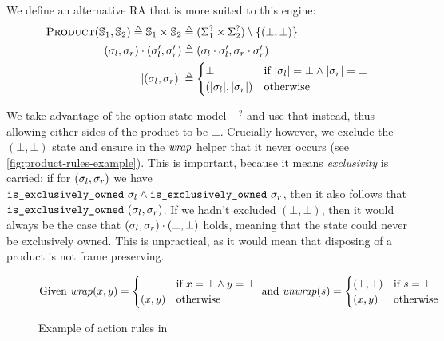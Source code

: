 We define an alternative \Product{} RA that is more suited to this engine: \begin{align*}
	\textsc{Product}(\mathbb S_1,\mathbb S_2) \triangleq \mathbb S_1 \times \mathbb S_2 &\triangleq (\Sigma_1^? \times \Sigma_2^?) \setminus \{(\bot, \bot)\}\\
	(\sigma_l, \sigma_r) \cdot (\sigma_l', \sigma_r') &\triangleq (\sigma_l \cdot \sigma_l', \sigma_r \cdot \sigma_r')\\
	|(\sigma_l, \sigma_r)| &\triangleq \begin{cases}
		\bot &\text{if}~|\sigma_l|=\bot\land |\sigma_r|=\bot\\
		(|\sigma_l|, |\sigma_r|) &\text{otherwise}
 	\end{cases}
\end{align*}

We take advantage of the option state model $-^?$ and use that instead, thus allowing either sides of the product to be $\bot$. Crucially however, we exclude the $(\bot, \bot)$ state and ensure in the ${\operatorname{\mathit{wrap}}}$ helper that it never occurs (see \autoref{fig:product-rules-example}). This is important, because it means \emph{exclusivity} is carried: if for $(\sigma_l,\sigma_r)$ we have ${\texttt{is\_exclusively\_owned}~\sigma_l \land \texttt{is\_exclusively\_owned}~\sigma_r}$, then it also follows that $\texttt{is\_exclusively\_owned}~(\sigma_l, \sigma_r)$. If we hadn't excluded $(\bot, \bot)$, then it would always be the case that $(\sigma_l,\sigma_r)\cdot(\bot,\bot)$ holds, meaning that the state could never be exclusively owned. This is unpractical, as it would mean that disposing of a product is not frame preserving.

\begin{figure}
	\centering
\begin{align*}
	\text{Given }
	{\operatorname{\mathit{wrap}}}(x, y) = \begin{cases}
		\bot &\text{if}~x=\bot \land y=\bot\\
		(x,y) &\text{otherwise}
	 \end{cases} \text{ and }
	 {\operatorname{\mathit{unwrap}}}(s) = \begin{cases}
 		(\bot, \bot) &\text{if} ~s=\bot\\
		(x, y) &\text{otherwise}
	 \end{cases}
\end{align*}
	\begin{mathpar}
\end{mathpar}
	\caption{Example of action rules in \Product}
	\label{fig:product-rules-example}
\end{figure}

